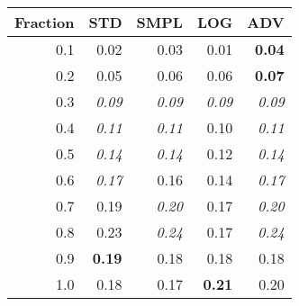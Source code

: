 \documentclass{standalone}
\begin{document}
\begin{tabular}{r|rrrr}
      \toprule
      Fraction & STD & SMPL & LOG & ADV\\
      \midrule
      0.1 & 0.02 & 0.03 & 0.01 & \textbf{0.04}\\
  0.2 & 0.05 & 0.06 & 0.06 & \textbf{0.07}\\
  0.3 & \emph{0.09} & \emph{0.09} & \emph{0.09} & \emph{0.09}\\
  0.4 & \emph{0.11} & \emph{0.11} & 0.10 & \emph{0.11}\\
  0.5 & \emph{0.14} & \emph{0.14} & 0.12 & \emph{0.14}\\
  0.6 & \emph{0.17} & 0.16 & 0.14 & \emph{0.17}\\
  0.7 & 0.19 & \emph{0.20} & 0.17 & \emph{0.20}\\
  0.8 & 0.23 & \emph{0.24} & 0.17 & \emph{0.24}\\
  0.9 & \textbf{0.19} & 0.18 & 0.18 & 0.18\\
  1.0 & 0.18 & 0.17 & \textbf{0.21} & 0.20\\
  \bottomrule
\end{tabular}
\end{document}
